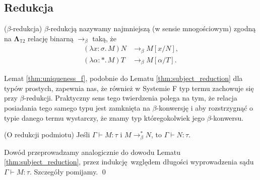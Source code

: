   \subsection{Redukcja}

  \begin{definicja}(\(\beta\)-redukcja)
    \(\beta\)-redukcją nazywamy najmniejszą (w sensie mnogościowym) zgodną na \(\mathbf{\Lambda}_{\mathbb{T}2}\) relację binarną \(\to_\beta\) taką, że
  \begin{align*}
    (\lambda x:\sigma.\,M)N &\to_\beta M[x/N],\\
    (\lambda \alpha:*.\,M) T &\to_\beta M[\alpha/T].
  \end{align*}
  \end{definicja}

Lemat \ref{thm:uniqueness_f}, podobnie do Lematu \ref{thm:subject_reduction} dla typów prostych, zapewnia nas, że również w Systemie F typ termu zachowuje się przy \(\beta\)-redukcji. Praktyczny sens tego twierdzenia polega na tym, że relacja posiadania tego samego typu jest zamknięta na \(\beta\)-konwersję i aby rozstrzygnąć o typie danego termu wystarczy, że znamy typ któregokolwiek jego \(\beta\)-konwersu.

\begin{lemat}(O redukcji podmiotu)\label{thm:uniqueness_f}
  Jeśli \(\Gamma\vdash M:\tau\) i \(M\to^{*}_\beta N\), to \(\Gamma\vdash N:\tau\).
\end{lemat}
\begin{dowod}
  Dowód przeprowadzamy analogicznie do dowodu Lematu \ref{thm:subject_reduction}, przez indukcję względem długości wyprowadzenia sądu \(\Gamma\vdash M:\tau\). Szczegóły pomijamy. \qed
\end{dowod}

